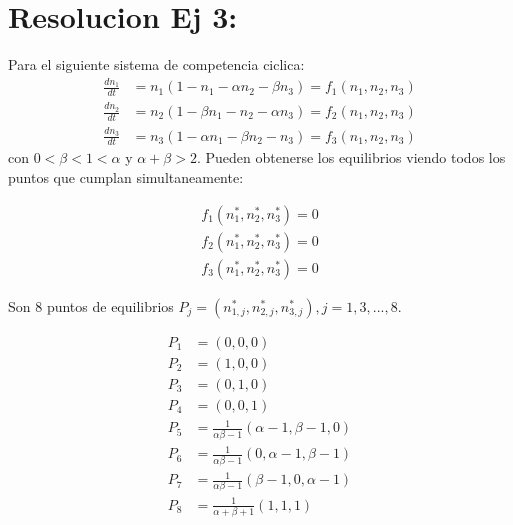 \documentclass[twocolumn,aps,prl]{revtex4-1}
\newcommand{\nstar}{n^*}
\begin{document}
% 
%                                 
% 

\section{Resolucion Ej 3:}

Para el siguiente sistema de competencia ciclica:
$$
\begin{aligned}
\frac{d n_{1}}{d t}&=n_{1}\left(1-n_{1}-\alpha n_{2}-\beta n_{3}\right) = f_1(n_1,n_2,n_3)\\
\frac{d n_{2}}{d t}&=n_{2}\left(1-\beta n_{1}-n_{2}-\alpha n_{3}\right) = f_2(n_1,n_2,n_3) \\
\frac{d n_{3}}{d t}&=n_{3}\left(1-\alpha n_{1}-\beta n_{2}-n_{3}\right) = f_3(n_1,n_2,n_3)
\end{aligned}
$$
con $0<\beta<1<\alpha$ y $\alpha+\beta>2$. Pueden obtenerse los  equilibrios viendo todos los puntos que cumplan simultaneamente: 

$$
\begin{aligned}
    f_1(\nstar_1,\nstar_2,\nstar_3) = 0\\ 
    f_2(\nstar_1,\nstar_2,\nstar_3) = 0\\ 
    f_3(\nstar_1,\nstar_2,\nstar_3) = 0   
\end{aligned}
$$

Son 8 puntos de equilibrios $P_j = (\nstar_{1,j},\nstar_{2,j},\nstar_{3,j}), j= 1, 3, ..., 8$.

$$
\begin{aligned}
    P_1 &= (0, 0, 0) \\ 
    P_2 &= (1, 0, 0) \\ 
    P_3 &= (0, 1, 0) \\ 
    P_4 &= (0, 0, 1) \\  
    P_5 &= \frac{1}{\alpha \beta - 1} 
                       (\alpha - 1, \beta - 1 , 0) \\ 
    P_6 &= \frac{1}{\alpha \beta - 1} 
                       (0         , \alpha - 1, \beta - 1) \\ 
    P_7 &= \frac{1}{\alpha \beta - 1} 
                       (\beta - 1 , 0         , \alpha - 1) \\ 
    P_8 &= \frac{1}{\alpha + \beta + 1}(1, 1, 1) 
\end{aligned}
$$
\end{document}
